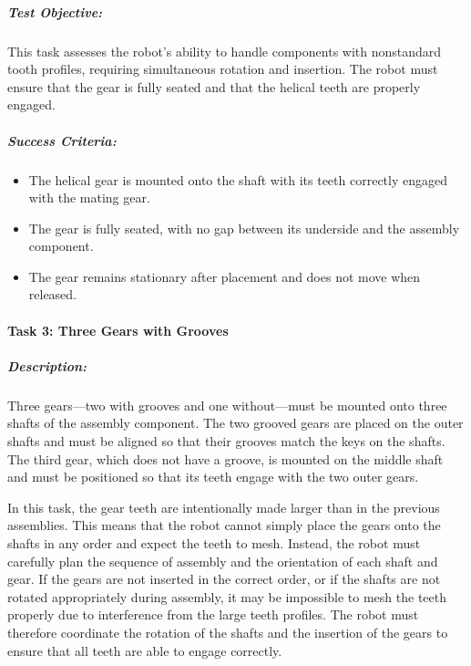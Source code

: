 \documentclass[letterpaper,10pt,english]{sphinxmanual}
\let\sphinxpxdimen\pdfpxdimen\else\newdimen\sphinxpxdimen
\begin{document}
\noindent{\hspace*{\fill}\sphinxincludegraphics[width=400\sphinxpxdimen]{{gear_assembly_taskboard_helical_gear}.png}\hspace*{\fill}}


\subparagraph{Test Objective:}
\label{\detokenize{robotic_instructions_gear_tasks:id2}}
\sphinxAtStartPar
This task assesses the robot’s ability to handle components with non\sphinxhyphen{}standard tooth profiles,
requiring simultaneous rotation and insertion. The robot must ensure that the gear is fully seated and that the helical teeth are properly engaged.


\subparagraph{Success Criteria:}
\label{\detokenize{robotic_instructions_gear_tasks:id3}}\begin{itemize}
\item {} 
\sphinxAtStartPar
The helical gear is mounted onto the shaft with its teeth correctly engaged with the mating gear.

\item {} 
\sphinxAtStartPar
The gear is fully seated, with no gap between its underside and the assembly component.

\item {} 
\sphinxAtStartPar
The gear remains stationary after placement and does not move when released.

\end{itemize}


\paragraph{Task 3: Three Gears with Grooves}
\label{\detokenize{robotic_instructions_gear_tasks:task-3-three-gears-with-grooves}}

\subparagraph{Description:}
\label{\detokenize{robotic_instructions_gear_tasks:id4}}
\sphinxAtStartPar
Three gears—two with grooves and one without—must be mounted onto three shafts of the assembly component.
The two grooved gears are placed on the outer shafts and must be aligned so that their grooves match the keys on the shafts.
The third gear, which does not have a groove, is mounted on the middle shaft and must be positioned so that its teeth engage with the two outer gears.

\sphinxAtStartPar
In this task, the gear teeth are intentionally made larger than in the previous assemblies.
This means that the robot cannot simply place the gears onto the shafts in any order and expect the teeth to mesh.
Instead, the robot must carefully plan the sequence of assembly and the orientation of each shaft and gear.
If the gears are not inserted in the correct order, or if the shafts are not rotated appropriately during assembly,
it may be impossible to mesh the teeth properly due to interference from the large teeth profiles.
The robot must therefore coordinate the rotation of the shafts and the insertion of the gears to ensure that all teeth are able to engage correctly.
\end{document}
